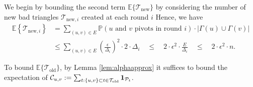 \documentclass{article} %
\renewcommand{\Pr}{\mathbb{P}}
\begin{document}
We begin by bounding the second term $\mathbb{E}\{\mathcal{T}_{\text{new}}\}$ by considering the number of new bad triangles $\mathcal{T}_{\text{new},i}$ created at each round $i$
Hence, we have
\begin{align*}
\mathbb{E}\left\{\mathcal{T}_{\text{new},i}\right\}
&=   \sum_{(u,v) \in E} \Pr(\text{$u$ and $v$ pivots in round $i$}) \cdot |\Gamma(u) \cup \Gamma(v)| \\
&\le \sum_{(u,v) \in E} \left(\frac{\epsilon}{\Delta_i}\right)^2 \cdot 2 \cdot \Delta_i
\quad\le\quad 2\cdot \epsilon^2\cdot \frac{E}{\Delta_i}
\quad\le\quad 2\cdot \epsilon^2 \cdot n.
\end{align*}

To bound $\mathbb{E}\{\mathcal{T}_\text{old}\}$,
by Lemma \ref{lem:alphaapprox} it suffices to bound the expectation of $\mathcal{C}_{u,v} := \sum_{t:\{u,v\}\subset t \in \mathcal{T}_\text{old}} {\bf 1}_{\mathcal{P}_t}$.
\end{document}
